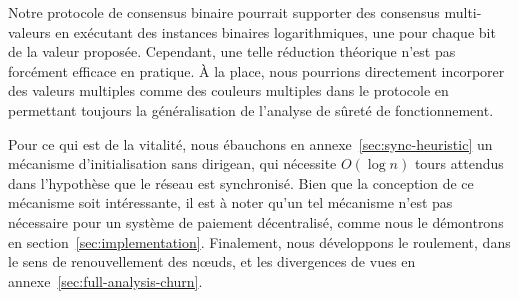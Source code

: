 \documentclass[a4,twocolumn,10pt]{article}
\newcommand{\Oh}[1]{O(#1)}
\theoremstyle{definition}
\begin{document}
Notre protocole de consensus binaire pourrait supporter des consensus multi-valeurs en exécutant des instances binaires
logarithmiques, une pour chaque bit de la valeur proposée. Cependant, une telle réduction théorique n'est pas
forcément efficace en pratique. À la place, nous pourrions directement incorporer des valeurs multiples comme des
couleurs multiples dans le protocole en permettant toujours la généralisation de l'analyse de sûreté de fonctionnement.

Pour ce qui est de la vitalité, nous ébauchons en annexe~\ref{sec:sync-heuristic} un mécanisme d'initialisation sans
dirigean, qui nécessite $\Oh{\log{n}}$ tours attendus dans l'hypothèse que le réseau est synchronisé. Bien que
la conception de ce mécanisme soit intéressante, il est à noter qu'un tel mécanisme n'est pas nécessaire pour un système
de paiement décentralisé, comme nous le démontrons en section~\ref{sec:implementation}.
Finalement, nous développons le roulement, dans le sens de renouvellement des nœuds, et les divergences de vues en annexe~\ref{sec:full-analysis-churn}.

\end{document}

